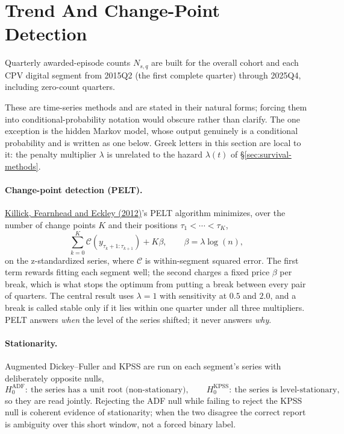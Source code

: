 \documentclass[11pt,a4paper]{article}
\begin{document}
\section{Trend And Change-Point Detection}
Quarterly awarded-episode counts \(N_{s,q}\) are built for the overall cohort
and each CPV digital segment from 2015Q2 (the first complete quarter) through
2025Q4, including zero-count quarters.

These are time-series methods and are stated in their natural forms; forcing
them into conditional-probability notation would obscure rather than clarify.
The one exception is the hidden Markov model, whose output genuinely is a
conditional probability and is written as one below. Greek letters in this
section are local to it: the penalty multiplier \(\lambda\) is unrelated to the
hazard \(\lambda(t)\) of \S\ref{sec:survival-methods}.

\paragraph{Change-point detection (PELT).}
\href{https://doi.org/10.1080/01621459.2012.737745}{Killick, Fearnhead and
Eckley (2012)}'s PELT algorithm minimizes, over the number of change points
\(K\) and their positions \(\tau_1<\cdots<\tau_K\),
\[
\sum_{k=0}^{K}\mathcal{C}\!\left(y_{\tau_k+1:\tau_{k+1}}\right)+K\beta,
\qquad
\beta=\lambda\log(n),
\]
on the z-standardized series, where \(\mathcal{C}\) is within-segment squared
error. The first term rewards fitting each segment well; the second charges a
fixed price \(\beta\) per break, which is what stops the optimum from putting a
break between every pair of quarters. The central result uses \(\lambda=1\) with
sensitivity at \(0.5\) and \(2.0\), and a break is called stable only if it lies
within one quarter under all three multipliers. PELT answers \emph{when} the
level of the series shifted; it never answers \emph{why}.

\paragraph{Stationarity.} Augmented Dickey--Fuller and KPSS are run on each
segment's series with deliberately opposite nulls,
\[
H_0^{\mathrm{ADF}}:\ \text{the series has a unit root (non-stationary)},
\qquad
H_0^{\mathrm{KPSS}}:\ \text{the series is level-stationary},
\]
so they are read jointly. Rejecting the ADF null while failing to reject the
KPSS null is coherent evidence of stationarity; when the two disagree the
correct report is ambiguity over this short window, not a forced binary label.
\end{document}
